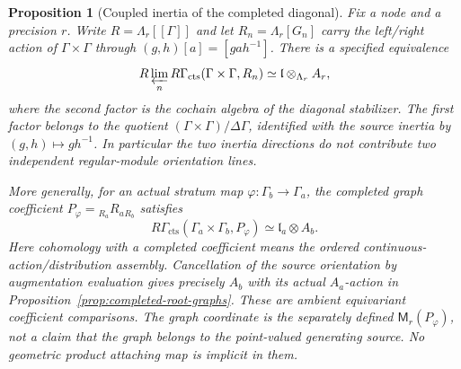 \documentclass[11pt]{article}
\newtheorem{proposition}{Proposition}[section]
\theoremstyle{definition}
\theoremstyle{remark}
\begin{document}
\begin{proposition}[Coupled inertia of the completed diagonal]
\label{prop:root-coupled-inertia}
Fix a node and a precision $r$.  Write $R=\Lambda_r[[\Gamma]]$
and let $R_n=\Lambda_r[G_n]$ carry the left/right action of
$\Gamma\times\Gamma$ through $(g,h)[a]=[gah^{-1}]$.  There is a
specified equivalence
\begin{equation}
 R\varprojlim_n R\Gamma_{\mathrm{cts}}
       (\Gamma\times\Gamma,R_n)
       \simeq \mathfrak l\otimes_{\Lambda_r} A_r,
 \label{eq:root-coupled-inertia}
\end{equation}
where the second factor is the cochain algebra of the diagonal
stabilizer.  The first factor belongs to the quotient
$(\Gamma\times\Gamma)/\Delta\Gamma$, identified with the source
inertia by $(g,h)\mapsto gh^{-1}$.  In particular the two inertia
directions do not contribute two independent regular-module
orientation lines.

More generally, for an actual stratum map
$\varphi:\Gamma_b\to\Gamma_a$, the completed graph coefficient
$P_\varphi={}_{R_a}R_a{}_{R_b}$ satisfies
\[
 R\Gamma_{\mathrm{cts}}(\Gamma_a\times\Gamma_b,P_\varphi)
       \simeq\mathfrak l_a\otimes A_b.
\]
Here cohomology with a completed coefficient means the ordered
continuous-action/distribution assembly.  Cancellation of the
source orientation by augmentation evaluation gives precisely
$A_b$ with its actual $A_a$-action in
Proposition~\ref{prop:completed-root-graphs}.
These are ambient equivariant coefficient comparisons.  The graph
coordinate is the separately defined $\mathsf M_r(P_\varphi)$,
not a claim that the graph belongs to the point-valued generating
source.  No geometric product attaching map is implicit in them.
\end{proposition}
\end{document}
